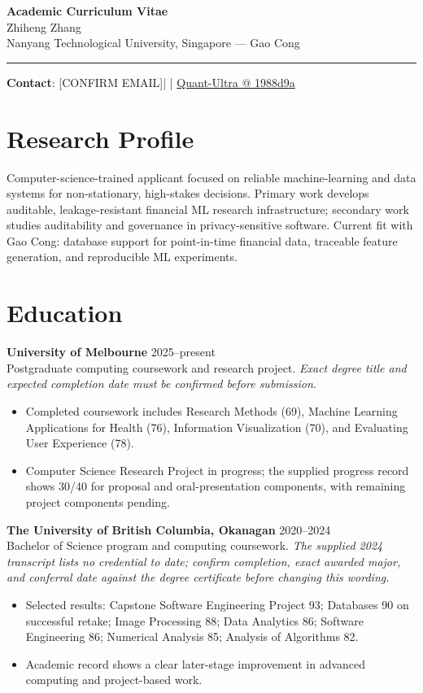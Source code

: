 \documentclass[11pt]{article}
\makeatletter
\newcommand{\ApplicantName}{Zhiheng Zhang}
\newcommand{\ApplicantEmail}{[CONFIRM EMAIL]}
\newcommand{\ApplicantPhone}{[CONFIRM PHONE]}
\newcommand{\ApplicantGitHub}{\href{https://github.com/zhiheng-zhang-Mera/Quant-Ultra/tree/1988d9a8530da91a8158de864d098ea869098923}{Quant-Ultra @ 1988d9a}}
\makeatother
\begin{document}
\begin{center}
{\LARGE\bfseries Academic Curriculum Vitae}\\[0.25em]
{\large \ApplicantName}\\
Nanyang Technological University, Singapore --- Gao Cong
\end{center}
\vspace{0.35em}\hrule\vspace{0.65em}

\textbf{Contact}: \ApplicantEmail\quad | \quad \ApplicantPhone\quad | \quad \ApplicantGitHub

\section*{Research Profile}
Computer-science-trained applicant focused on reliable machine-learning and data systems for non-stationary, high-stakes decisions. Primary work develops auditable, leakage-resistant financial ML research infrastructure; secondary work studies auditability and governance in privacy-sensitive software. Current fit with Gao Cong: database support for point-in-time financial data, traceable feature generation, and reproducible ML experiments.

\section*{Education}
\textbf{University of Melbourne} \hfill 2025--present\\
Postgraduate computing coursework and research project. \textit{Exact degree title and expected completion date must be confirmed before submission.}
\begin{itemize}
\item Completed coursework includes Research Methods (69), Machine Learning Applications for Health (76), Information Visualization (70), and Evaluating User Experience (78).
\item Computer Science Research Project in progress; the supplied progress record shows 30/40 for proposal and oral-presentation components, with remaining project components pending.
\end{itemize}

\textbf{The University of British Columbia, Okanagan} \hfill 2020--2024\\
Bachelor of Science program and computing coursework. \textit{The supplied 2024 transcript lists no credential to date; confirm completion, exact awarded major, and conferral date against the degree certificate before changing this wording.}
\begin{itemize}
\item Selected results: Capstone Software Engineering Project 93; Databases 90 on successful retake; Image Processing 88; Data Analytics 86; Software Engineering 86; Numerical Analysis 85; Analysis of Algorithms 82.
\item Academic record shows a clear later-stage improvement in advanced computing and project-based work.
\end{itemize}
\end{document}

